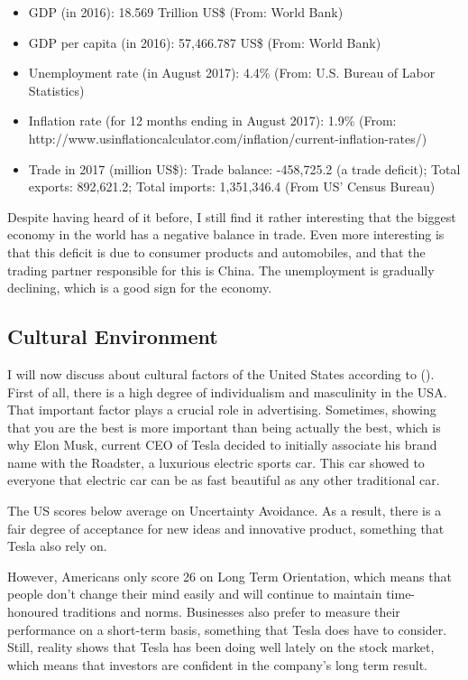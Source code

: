 \documentclass[12pt]{article}
\begin{document}
\begin{itemize}
	\item{GDP (in 2016): 18.569 Trillion US\$ (From: World Bank)}
	\item{GDP per capita (in 2016): 57,466.787 US\$ (From: World Bank)}
	\item{Unemployment rate (in August 2017): 4.4\% (From: U.S. Bureau of Labor Statistics)}
	\item{Inflation rate (for 12 months ending in August 2017): 1.9\% (From: http://www.usinflationcalculator.com/inflation/current-inflation-rates/)}
	\item{Trade in 2017 (million US\$): Trade balance: -458,725.2 (a trade deficit); Total exports: 892,621.2; Total imports: 1,351,346.4 (From US' Census Bureau)}
\end{itemize}

Despite having heard of it before, I still find it rather interesting that the biggest economy in the world has a negative balance in trade. Even more interesting is that this deficit is due to consumer products and automobiles, and that the trading partner responsible for this is China. The unemployment is gradually declining, which is a good sign for the economy.

\subsection{Cultural Environment}

I will now discuss about cultural factors of the United States according to (\cite{hoUS}). First of all, there is a high degree of individualism and masculinity in the USA. That important factor plays a crucial role in advertising. Sometimes, showing that you are the best is more important than being actually the best, which is why Elon Musk, current CEO of Tesla decided to initially associate his brand name with the Roadster, a luxurious electric sports car. This car showed to everyone that electric car can be as fast beautiful as any other traditional car.

The US scores below average on Uncertainty Avoidance. As a result, there is a fair degree of acceptance for new ideas and innovative product, something that Tesla also rely on.

However, Americans only score 26 on Long Term Orientation, which means that people don't change their mind easily and will continue to maintain time-honoured traditions and norms. Businesses also prefer to measure their performance on a short-term basis, something that Tesla does have to consider. Still, reality shows that Tesla has been doing well lately on the stock market, which means that investors are confident in the company's long term result.
\end{document}
